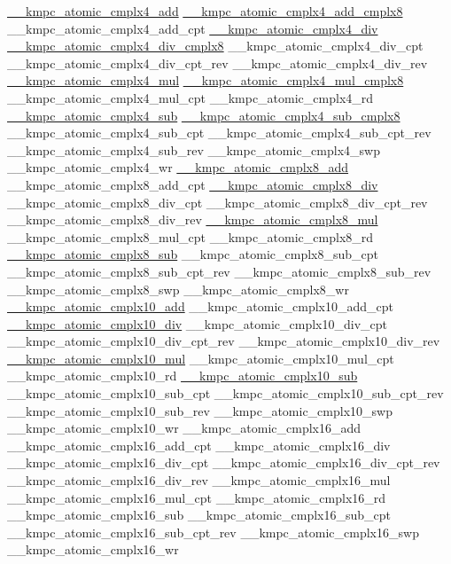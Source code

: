 \begin{DoxyCode}
\hyperlink{kmp__atomic_8h_af98f89feb10c6c893e3824520f0f99ca}{\_\_kmpc\_atomic\_cmplx4\_add}
\hyperlink{kmp__atomic_8h_a37f581a0a5f0888b0f165d1df796bbbe}{\_\_kmpc\_atomic\_cmplx4\_add\_cmplx8}
\_\_kmpc\_atomic\_cmplx4\_add\_cpt
\hyperlink{kmp__atomic_8h_a5f586bffee841cd1f958dc82b04a428b}{\_\_kmpc\_atomic\_cmplx4\_div}
\hyperlink{kmp__atomic_8h_a3f9c5cf4e414356f394ab3107e9203ca}{\_\_kmpc\_atomic\_cmplx4\_div\_cmplx8}
\_\_kmpc\_atomic\_cmplx4\_div\_cpt
\_\_kmpc\_atomic\_cmplx4\_div\_cpt\_rev
\_\_kmpc\_atomic\_cmplx4\_div\_rev
\hyperlink{kmp__atomic_8h_a79d14b7237fa5d2bef895a81ae9192fc}{\_\_kmpc\_atomic\_cmplx4\_mul}
\hyperlink{kmp__atomic_8h_a62b78b4224f85c804e62e19fe67cdac1}{\_\_kmpc\_atomic\_cmplx4\_mul\_cmplx8}
\_\_kmpc\_atomic\_cmplx4\_mul\_cpt
\_\_kmpc\_atomic\_cmplx4\_rd
\hyperlink{kmp__atomic_8h_ae96b5b6426cd308b3e848af809db6ebd}{\_\_kmpc\_atomic\_cmplx4\_sub}
\hyperlink{kmp__atomic_8h_a34cf9c863b698c629b696995cea5a329}{\_\_kmpc\_atomic\_cmplx4\_sub\_cmplx8}
\_\_kmpc\_atomic\_cmplx4\_sub\_cpt
\_\_kmpc\_atomic\_cmplx4\_sub\_cpt\_rev
\_\_kmpc\_atomic\_cmplx4\_sub\_rev
\_\_kmpc\_atomic\_cmplx4\_swp
\_\_kmpc\_atomic\_cmplx4\_wr
\hyperlink{kmp__atomic_8h_a825ab42a68834efa72914936f503a96e}{\_\_kmpc\_atomic\_cmplx8\_add}
\_\_kmpc\_atomic\_cmplx8\_add\_cpt
\hyperlink{kmp__atomic_8h_a812608a83f9629ddbacbfce7672c773b}{\_\_kmpc\_atomic\_cmplx8\_div}
\_\_kmpc\_atomic\_cmplx8\_div\_cpt
\_\_kmpc\_atomic\_cmplx8\_div\_cpt\_rev
\_\_kmpc\_atomic\_cmplx8\_div\_rev
\hyperlink{kmp__atomic_8h_a166d7055eeedf15f0d49facdf5dc1559}{\_\_kmpc\_atomic\_cmplx8\_mul}
\_\_kmpc\_atomic\_cmplx8\_mul\_cpt
\_\_kmpc\_atomic\_cmplx8\_rd
\hyperlink{kmp__atomic_8h_a97e114222415ef9d6a208f64e40ef87a}{\_\_kmpc\_atomic\_cmplx8\_sub}
\_\_kmpc\_atomic\_cmplx8\_sub\_cpt
\_\_kmpc\_atomic\_cmplx8\_sub\_cpt\_rev
\_\_kmpc\_atomic\_cmplx8\_sub\_rev
\_\_kmpc\_atomic\_cmplx8\_swp
\_\_kmpc\_atomic\_cmplx8\_wr
\hyperlink{kmp__atomic_8h_a68ad2469bd6169d30dac85fd2cb4f93f}{\_\_kmpc\_atomic\_cmplx10\_add}
\_\_kmpc\_atomic\_cmplx10\_add\_cpt
\hyperlink{kmp__atomic_8h_a69470d00192095533b6f04530c514342}{\_\_kmpc\_atomic\_cmplx10\_div}
\_\_kmpc\_atomic\_cmplx10\_div\_cpt
\_\_kmpc\_atomic\_cmplx10\_div\_cpt\_rev
\_\_kmpc\_atomic\_cmplx10\_div\_rev
\hyperlink{kmp__atomic_8h_afe8a6526935f9433ffa89ab525fe3675}{\_\_kmpc\_atomic\_cmplx10\_mul}
\_\_kmpc\_atomic\_cmplx10\_mul\_cpt
\_\_kmpc\_atomic\_cmplx10\_rd
\hyperlink{kmp__atomic_8h_a61d175b6d9a0fdfa184b02a47f0165b1}{\_\_kmpc\_atomic\_cmplx10\_sub}
\_\_kmpc\_atomic\_cmplx10\_sub\_cpt
\_\_kmpc\_atomic\_cmplx10\_sub\_cpt\_rev
\_\_kmpc\_atomic\_cmplx10\_sub\_rev
\_\_kmpc\_atomic\_cmplx10\_swp
\_\_kmpc\_atomic\_cmplx10\_wr
\_\_kmpc\_atomic\_cmplx16\_add
\_\_kmpc\_atomic\_cmplx16\_add\_cpt
\_\_kmpc\_atomic\_cmplx16\_div
\_\_kmpc\_atomic\_cmplx16\_div\_cpt
\_\_kmpc\_atomic\_cmplx16\_div\_cpt\_rev
\_\_kmpc\_atomic\_cmplx16\_div\_rev
\_\_kmpc\_atomic\_cmplx16\_mul
\_\_kmpc\_atomic\_cmplx16\_mul\_cpt
\_\_kmpc\_atomic\_cmplx16\_rd
\_\_kmpc\_atomic\_cmplx16\_sub
\_\_kmpc\_atomic\_cmplx16\_sub\_cpt
\_\_kmpc\_atomic\_cmplx16\_sub\_cpt\_rev
\_\_kmpc\_atomic\_cmplx16\_swp
\_\_kmpc\_atomic\_cmplx16\_wr
\end{DoxyCode}
 


